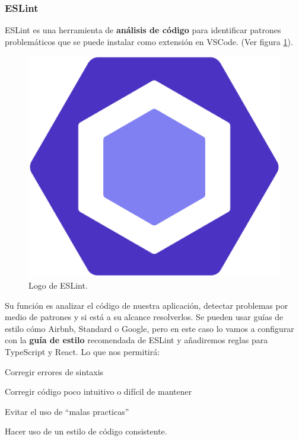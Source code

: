 \documentclass[12pt,twoside,titlepage]{report}
\begin{document}
\subsubsection{ESLint}

ESLint es una herramienta de \textbf{análisis de código} para identificar patrones problemáticos que se puede instalar como extensión en VSCode.
(Ver figura \ref{fig:ESLintLogo}).

\begin{figure}[H]
    \centering
    \includegraphics[scale=0.05]{VSCode/ESLint}
    \caption{Logo de ESLint.}
    \label{fig:ESLintLogo}
\end{figure}

Su función es analizar el código de nuestra aplicación, detectar problemas por medio de patrones y si está a su alcance resolverlos. Se pueden usar guías de estilo cómo Airbnb, Standard o Google, pero en este caso lo vamos a configurar con la \textbf{guía de estilo} recomendada de ESLint y añadiremos reglas para TypeScript y React. Lo que nos permitirá:

\begin{compactitem}
 \item Corregir errores de sintaxis
 \item Corregir código poco intuitivo o difícil de mantener
 \item Evitar el uso de ``malas practicas''
 \item Hacer uso de un estilo de código consistente.
\end{compactitem}
\end{document}
